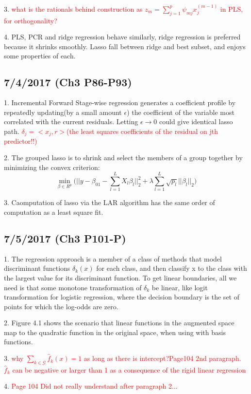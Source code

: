 \documentclass[a4paper, 12pt]{article}
\begin{document}
3. \textcolor{red}{ what is the rationals behind construction as $z_m=\sum_{j=1}^{p}\psi_{mj}x_j^{(m-1)} $ in PLS, for orthogonality?}

4. PLS, PCR and ridge regression behave similarly, ridge regression is preferred because it shrinks smoothly. Lasso fall between ridge and best subset, and enjoys some properties of each.

\subsection*{7/4/2017 (Ch3 P86-P93)}

1. Incremental Forward Stage-wise regression generates a coefficient profile by repeatedly updating(by a small amount $\epsilon$) the coefficient of the variable most correlated with the current residuals. Letting $\epsilon \rightarrow 0$ could give identical lasso path. \textcolor{red}{$\delta_j=<x_j,r>$(the least squares coefficients of the residual on jth predictor!!)}

2. The grouped lasso is to shrink and select the members of a group together by minimizing the convex criterion:$$\displaystyle{\min_{\beta \in R^p}}\Bigg(||y-\beta_01-\sum_{l=1}^{L}X_l\beta_l||_2^2 + \lambda\sum_{l=1}^{L}\sqrt{p_l}||\beta_l||_2\Bigg)$$

3. Caomputation of lasso via the LAR algorithm has the same order of computation as a least square fit.


\subsection*{7/5/2017 (Ch3 P101-P)}

1. The regression approach is a member of a class of methods that model discriminant functions $\delta_k(x)$ for each class, and then classify x to the class with the largest value for its discriminant function. To get linear boundaries, all we need is that some monotone transformation of $\delta_k$ be linear, like logit transformation for logistic regression, where the decision boundary is the set of points for which the log-odds are zero.

2. Figure 4.1 shows the scenario that linear functions in the augmented space map to the quadratic function in the original space, when using with basis functions.

3. \textcolor{red}{why $\sum_{k \in \mathcal{G}}^{}\hat{f}_k(x)=1$ as long as there is intercept?Page104 2nd paragraph. $\hat{f}_k$ can be negative or larger than 1 as a consequence of the rigid linear regression}

4. \textcolor{red}{Page 104 Did not really understand after paragraph 2...}
\end{document}
